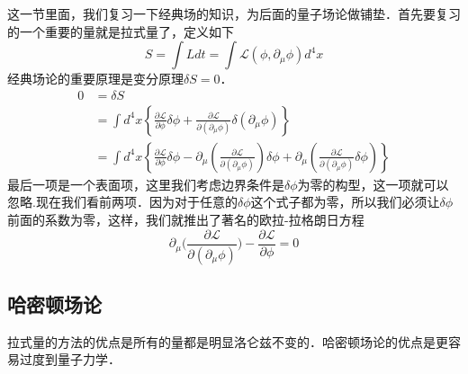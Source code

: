 
这一节里面，我们复习一下经典场的知识，为后面的量子场论做铺垫．首先要复习的一个重要的量就是拉式量了，定义如下
\begin{equation}
S = \int L dt = \int \mathcal L(\phi,\partial_\mu \phi)d^4 x
\end{equation}
经典场论的重要原理是变分原理$\delta S = 0$．
\begin{equation}
\begin{aligned}
0 &=\delta S \\
&=\int d^{4} x\left\{\frac{\partial \mathcal{L}}{\partial \phi} \delta \phi+\frac{\partial \mathcal{L}}{\partial\left(\partial_{\mu} \phi\right)} \delta\left(\partial_{\mu} \phi\right)\right\} \\
&=\int d^{4} x\left\{\frac{\partial \mathcal{L}}{\partial \phi} \delta \phi-\partial_{\mu}\left(\frac{\partial \mathcal{L}}{\partial\left(\partial_{\mu} \phi\right)}\right) \delta \phi+\partial_{\mu}\left(\frac{\partial \mathcal{L}}{\partial\left(\partial_{\mu} \phi\right)} \delta \phi\right)\right\}
\end{aligned}
\end{equation} 
最后一项是一个表面项，这里我们考虑边界条件是$\delta \phi$为零的构型，这一项就可以忽略.现在我们看前两项．因为对于任意的$\delta \phi$这个式子都为零，所以我们必须让$\delta \phi$前面的系数为零，这样，我们就推出了著名的欧拉-拉格朗日方程
\begin{equation}
\partial_\mu \bigg( \frac{\partial \mathcal L}{\partial(\partial_\mu\phi)} \bigg) - \frac{\partial \mathcal L}{\partial \phi} = 0 
\end{equation}

\subsection{哈密顿场论}
拉式量的方法的优点是所有的量都是明显洛仑兹不变的．哈密顿场论的优点是更容易过度到量子力学．

